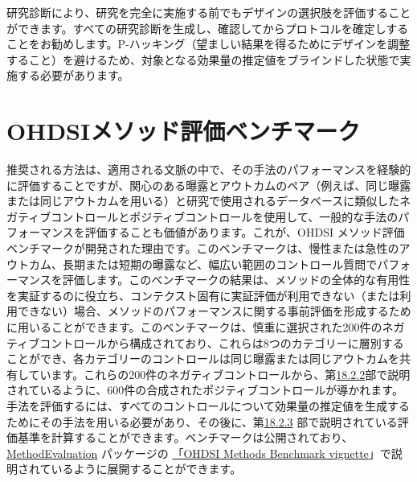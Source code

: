 \documentclass[
  11pt]{book}
\makeatletter
\newenvironment{kframe}{%
\medskip{}
\setlength{\fboxsep}{.8em}
 \def\at@end@of@kframe{}%
 \ifinner\ifhmode%
  \def\at@end@of@kframe{\end{minipage}}%
  \begin{minipage}{\columnwidth}%
 \fi\fi%
 \def\FrameCommand##1{\hskip\@totalleftmargin \hskip-\fboxsep
 \colorbox{myShadeColor}{##1}\hskip-\fboxsep
     \hskip-\linewidth \hskip-\@totalleftmargin \hskip\columnwidth}%
 \MakeFramed {\advance\hsize-\width
   \@totalleftmargin\z@ \linewidth\hsize
   \@setminipage}}%
 {\par\unskip\endMakeFramed%
 \at@end@of@kframe}
\newenvironment{rmdblock}[1]
  {
  \begin{itemize}
  \renewcommand{\labelitemi}{
    \raisebox{-.7\height}[0pt][0pt]{
      {\setkeys{Gin}{width=3em,keepaspectratio}\texttt{[image: images/\#1]}}
    }
  }
  \setlength{\fboxsep}{1em}
  \begin{kframe}
  \item
  }
  {
  \end{kframe}
  \end{itemize}
  }
\newenvironment{rmdimportant}
  {\begin{rmdblock}{important}}
  {\end{rmdblock}}
\theoremstyle{definition}
\theoremstyle{definition}
\theoremstyle{definition}
\theoremstyle{definition}
\theoremstyle{remark}
\makeatother
\begin{document}
\begin{rmdimportant}
研究診断により、研究を完全に実施する前でもデザインの選択肢を評価することができます。すべての研究診断を生成し、確認してからプロトコルを確定しすることをお勧めします。P-ハッキング（望ましい結果を得るためにデザインを調整すること）を避けるため、対象となる効果量の推定値をブラインドした状態で実施する必要があります。
\end{rmdimportant}

\section{OHDSIメソッド評価ベンチマーク}\label{ohdsiux30e1ux30bdux30c3ux30c9ux8a55ux4fa1ux30d9ux30f3ux30c1ux30deux30fcux30af}


推奨される方法は、適用される文脈の中で、その手法のパフォーマンスを経験的に評価することですが、関心のある曝露とアウトカムのペア（例えば、同じ曝露または同じアウトカムを用いる）と研究で使用されるデータベースに類似したネガティブコントロールとポジティブコントロールを使用して、一般的な手法のパフォーマンスを評価することも価値があります。これが、OHDSI メソッド評価ベンチマークが開発された理由です。このベンチマークは、慢性または急性のアウトカム、長期または短期の曝露など、幅広い範囲のコントロール質問でパフォーマンスを評価します。このベンチマークの結果は、メソッドの全体的な有用性を実証するのに役立ち、コンテクスト固有に実証評価が利用できない（または利用できない）場合、メソッドのパフォーマンスに関する事前評価を形成するために用いることができます。このベンチマークは、慎重に選択された200件のネガティブコントロールから構成されており、これらは8つのカテゴリーに層別することができ、各カテゴリーのコントロールは同じ曝露または同じアウトカムを共有しています。これらの200件のネガティブコントロールから、第\href{https://ohdsi.github.io/TheBookOfOhdsi/MethodValidity.html\#PositiveControls}{18.2.2}部で説明されているように、600件の合成されたポジティブコントロールが導かれます。手法を評価するには、すべてのコントロールについて効果量の推定値を生成するためにその手法を用いる必要があり、その後に、第\href{https://ohdsi.github.io/TheBookOfOhdsi/MethodValidity.html\#metrics}{18.2.3} 部で説明されている評価基準を計算することができます。ベンチマークは公開されており、\href{https://ohdsi.github.io/MethodEvaluation/}{MethodEvaluation} パッケージの \href{https://ohdsi.github.io/MethodEvaluation/articles/OhdsiMethodsBenchmark.html}{「OHDSI Methods Benchmark vignette}」で説明されているように展開することができます。
\end{document}
